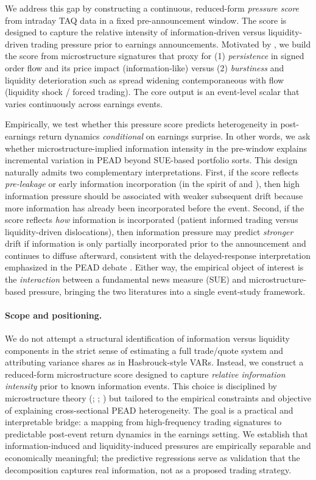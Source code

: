 We address this gap by constructing a continuous, reduced-form \emph{pressure score} from intraday
TAQ data in a fixed pre-announcement window. The score is designed to capture the relative intensity
of information-driven versus liquidity-driven trading pressure prior to earnings announcements. %
Motivated by \citet{Hasbrouck1991}, we build the score from microstructure signatures that proxy for
(1) \emph{persistence} in signed order flow and its price impact (information-like) versus
(2) \emph{burstiness} and liquidity deterioration such as spread widening contemporaneous with flow
(liquidity shock / forced trading). The core output is an event-level scalar that varies continuously
across earnings events.

Empirically, we test whether this pressure score predicts heterogeneity in post-earnings return dynamics
\emph{conditional} on earnings surprise. In other words, we ask whether microstructure-implied
information intensity in the pre-window explains incremental variation in PEAD beyond SUE-based
portfolio sorts. This design naturally admits two complementary interpretations.
First, if the score reflects \emph{pre-leakage} or early information incorporation (in the spirit of
\citet{Kyle1985} and \citet{Hasbrouck1991}), then high information pressure should be associated with
weaker subsequent drift because more information has already been incorporated before the event.
Second, if the score reflects \emph{how} information is incorporated (patient informed trading versus
liquidity-driven dislocations), then information pressure may predict \emph{stronger} drift if
information is only partially incorporated prior to the announcement and continues to diffuse afterward,
consistent with the delayed-response interpretation emphasized in the PEAD debate \citep{BernardThomas1989}.
Either way, the empirical object of interest is the \emph{interaction} between a fundamental news measure
(SUE) and microstructure-based pressure, bringing the two literatures into a single event-study framework.

\paragraph{Scope and positioning.}
We do not attempt a structural identification of information versus liquidity components in the strict
sense of estimating a full trade/quote system and attributing variance shares as in Hasbrouck-style VARs.
Instead, we construct a reduced-form microstructure score designed to capture \emph{relative information
intensity} prior to known information events. This choice is disciplined by microstructure theory
(\citealp{Kyle1985}; \citealp{GlostenMilgrom1985}; \citealp{Hasbrouck1991}) but tailored to the empirical
constraints and objective of explaining cross-sectional PEAD heterogeneity. The goal is a practical
and interpretable bridge: a mapping from high-frequency trading signatures to predictable post-event return dynamics in the earnings setting. We establish that information-induced and liquidity-induced pressures are empirically separable and economically meaningful; the predictive regressions serve as validation that the decomposition captures real information, not as a proposed trading strategy.


